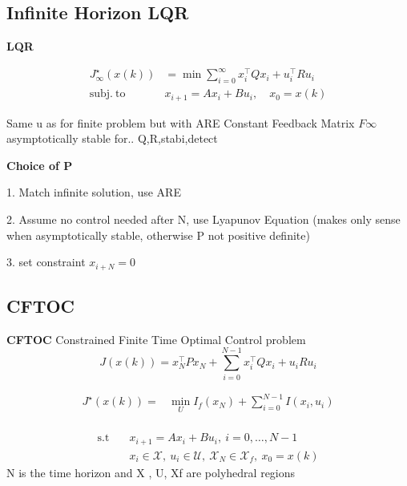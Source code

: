 \subsection{Infinite Horizon LQR}
\begin{sstTitleBox}[ForestGreen]{\center\textbf{\large
			LQR
		}
	}

	\[ \begin{aligned}
			J_\infty^\star(x(k))  & = \min \sum_{i=0}^\infty
			x_i^\top Q x_i + u_i^\top R u_i                                   \\
			\mathrm{subj.\ to }\  & x_{i+1} = Ax_i + Bu_i,\quad    x_0 = x(k)
		\end{aligned} \]

	Same u as for finite problem but with ARE
	Constant  Feedback Matrix $F\infty$
	asymptotically stable for.. Q,R,stabi,detect


\end{sstTitleBox}

\textbf{Choice of P}

1. Match infinite solution, use ARE

2. Assume no control needed after N, use Lyapunov Equation %
(makes only sense when asymptotically stable, otherwise P not positive definite)

3. set constraint $x_{i+N}=0$

\subsection{CFTOC}

\begin{sstTitleBox}[ForestGreen]{\textbf{\large
			CFTOC
		}
		Constrained Finite Time Optimal Control problem
	}
	\[
		J(x(k)) = x_N^\top P x_N + \sum_{i=0}^{N-1}x_i^\top Q x_i + u_i R u_i
	\]
	\begin{centering}
		\begin{sstFrame}[ForestGreen]
			\vspace{-1.5mm}
			\color{white}
			\[ \begin{aligned}
					J^\star (x(k)) = & \min_{U}  I_f(x_N) + \sum_{i=0}^{N-1} I(x_{i}, u_{i}) \\
				\end{aligned} \]
			\vspace{-2.5mm}
		\end{sstFrame}
		\[ \begin{aligned}
				\text{s.t} \quad & x_{i+1} = A x_{i} + Bu_{i},\ i = 0,\dots,N-1                                                  \\
				                 & x_{i} \in \mathcal{X},\ u_{i} \in \mathcal{U},\ \mathcal{X}_N \in \mathcal{X}_f, \ x_0 = x(k)
			\end{aligned} \]
		N is the time horizon and X , U, Xf are polyhedral regions
	\end{centering}
\end{sstTitleBox}

